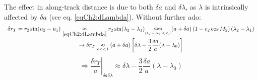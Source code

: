 			\indent The effect in along-track distance is due to both $\delta a$ and $\delta \lambda$, as $\lambda$ is intrinsically affected by $\delta a$ (see eq. \eqref{eqCh2:dLambda}). Without further ado:
			\[
			\begin{array}{cc}
			\delta r_T = r_2 \sin(u_2 - u_1) \underset{\eqref{eqCh2:dLambda}}{\approx} r_2 \sin(\lambda_2 - \lambda_1) \underset{\tiny{\abs{\lambda_2 - \lambda_1} << 1}}{\longapprox} (a + \delta a) \left(1 - e_2 \cos M_2\right) (\lambda_2 - \lambda_1) \\[1em]
			\rightarrow \delta r_T\underset{e<<1}{\approx} (a + \delta a) \left[\delta \lambda - \dfrac{3}{2}\dfrac{\delta a}{a} (\lambda - \lambda_0) \right] 
			\end{array}
			\]
			\begin{equation}
			\label{eqCh2:r_T_a_lam} \Rightarrow\left.\dfrac{\delta r_T}{a}\right\rvert_{\delta a \delta\lambda} \approx \delta\lambda - \dfrac{3}{2}\dfrac{\delta a}{a} (\lambda - \lambda_0)
			\end{equation}
